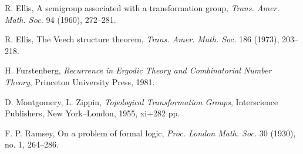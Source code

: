 \documentclass[11pt]{amsart}
\theoremstyle{definition}
\numberwithin{equation}{section}
\theoremstyle{definition}
\begin{document}
R. Ellis,
A semigroup associated with a transformation group,
\textit{Trans. Amer. Math. Soc.} 94 (1960), 272--281.

R. Ellis,
The Veech structure theorem,
\textit{Trans. Amer. Math. Soc.} 186 (1973), 203--218.

H. Furstenberg, \textit{Recurrence in Ergodic Theory and Combinatorial Number Theory}, Princeton University Press, 1981.







D. Montgomery, L. Zippin,
\textit{Topological Transformation Groups},
Interscience Publishers, New York--London, 1955, xi+282 pp.




F. P. Ramsey, 
On a problem of formal logic, \textit{Proc. London Math. Soc.} 30 (1930), no. 1, 264--286.
\end{document}
